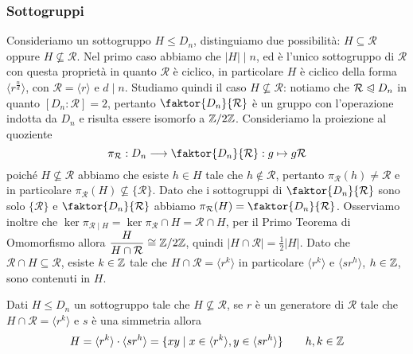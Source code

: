 \documentclass[11pt]{scrartcl}
\begin{document}
\subsubsection{Sottogruppi}

Consideriamo un sottogruppo $H\leqslant D_n$, distinguiamo due possibilità: 
$H \subseteq \mathcal{R}$ oppure $H \nsubseteq \mathcal{R}$. Nel primo caso
abbiamo che $|H|\mid n$, ed è l'unico sottogruppo di $\mathcal{R}$ con questa 
proprietà in quanto $\mathcal{R}$ è ciclico, in particolare $H$ è ciclico 
della forma $\langle r^{\frac n d}\rangle$, con $\mathcal{R} = 
\langle r\rangle$ e $d \mid n$. \newline
Studiamo quindi il caso $H \nsubseteq \mathcal{R}$: notiamo che 
$\mathcal{R}\trianglelefteqslant D_n$ in quanto $[D_n : \mathcal{R}] = 2$,
pertanto $\faktor{D_n}{\mathcal{R}}$ è un gruppo con l'operazione indotta da $D_n$
e risulta essere isomorfo a $\mathbb{Z}/{2}\mathbb{Z}$. \newline
Consideriamo la proiezione al quoziente 
\[
    \pi_{\mathcal{R}}: D_n \longrightarrow \faktor{D_n}{\mathcal{R}} : g \mapsto g\mathcal{R}
\]
poiché $H \nsubseteq \mathcal{R}$ abbiamo che esiste $h \in H$ tale che 
$h \notin \mathcal{R}$, pertanto $\pi_{\mathcal{R}}(h) \neq \mathcal{R}$ e
in particolare $\pi_{\mathcal{R}}(H) \nsubseteq \{\mathcal{R}\}$. Dato che i 
sottogruppi di $\faktor{D_n}{\mathcal{R}}$ sono solo $\{\mathcal{R}\}$ e
$\faktor{D_n}{\mathcal{R}}$ abbiamo $\pi_{\mathcal{R}}(H) = 
\faktor{D_n}{\mathcal{R}}$. Osserviamo inoltre che $\ker \pi_{\mathcal{R}\mid H} = 
\ker \pi_{\mathcal{R}} \cap H = \mathcal{R}\cap H$, per il Primo Teorema di Omomorfismo
allora $\displaystyle\frac{H}{H\cap \mathcal{R}} \cong \mathbb{Z}/{2}\mathbb{Z}$, quindi 
$|H\cap\mathcal{R}| = \displaystyle\frac 1 2 |H|$. Dato che $\mathcal{R}\cap H \subseteq
\mathcal{R}$, esiste $k \in \mathbb Z$ tale che $H\cap\mathcal{R} = \langle r^k\rangle$
in particolare $\langle r^k\rangle$ e $\langle sr^h\rangle$, $h \in \mathbb Z$, sono
contenuti in $H$. 

\begin{proposition}
    Dati $H\leqslant D_n$ un sottogruppo tale che $H\nsubseteq \mathcal{R}$, se
    $r$ è un generatore di $\mathcal{R}$ tale che $H\cap\mathcal{R} = \langle r^k\rangle$ 
    e $s$ è una simmetria allora \[
    H = \langle r^k\rangle\cdot\langle sr^h\rangle = \{xy \mid x \in \langle r^k\rangle,
    y \in \langle sr^h\rangle\}\qquad h, k \in \mathbb Z
    \]
\end{proposition}
\end{document}
